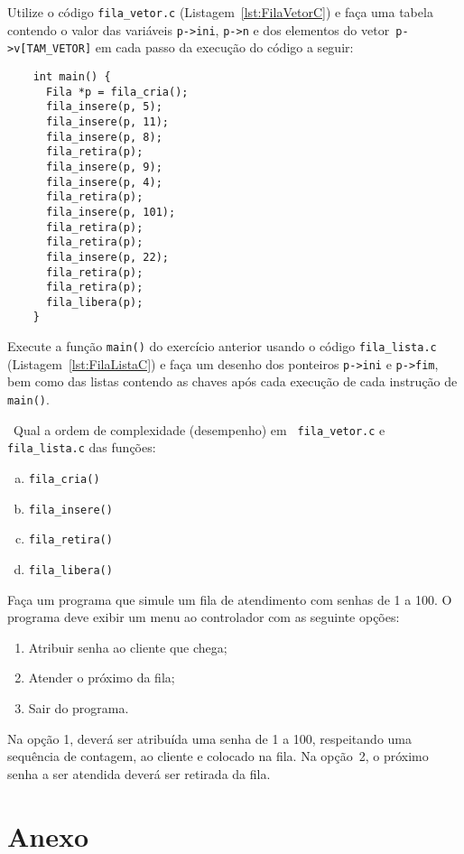 \lstset{basicstyle=\scriptsize,frame=single}

\exercise Utilize o código {\tt fila\_vetor.c}
(Listagem~\ref{lst:FilaVetorC}) e faça uma tabela contendo o valor
das variáveis {\tt p->ini}, {\tt p->n} e dos elementos do vetor{\tt
  p->v[TAM\_VETOR]} em cada passo da execução do código a seguir:

\begin{center}
  \begin{lstlisting}
    int main() {
      Fila *p = fila_cria();
      fila_insere(p, 5);
      fila_insere(p, 11);
      fila_insere(p, 8);
      fila_retira(p);
      fila_insere(p, 9);
      fila_insere(p, 4);
      fila_retira(p);
      fila_insere(p, 101);
      fila_retira(p);
      fila_retira(p);
      fila_insere(p, 22);
      fila_retira(p);
      fila_retira(p);
      fila_libera(p);
    }
  \end{lstlisting}
\end{center}

\exercise Execute a função {\tt main()} do exercício anterior usando o
código {\tt fila\_lista.c} (Listagem~\ref{lst:FilaListaC}) e faça um
desenho dos ponteiros {\tt p->ini} e {\tt p->fim}, bem como das listas
contendo as chaves após cada execução de cada instrução de {\tt main()}.

\exercise~Qual a ordem de complexidade (desempenho) em {\tt
  fila\_vetor.c} e {\tt fila\_lista.c} das funções:

\begin{enumerate}[a)]
\item {\tt fila\_cria()}
\item {\tt fila\_insere()}
\item {\tt fila\_retira()}
\item {\tt fila\_libera()}
\end{enumerate}

\exercise Faça um programa que simule um fila de atendimento com
senhas de 1 a 100. O programa deve exibir um menu ao controlador com
as seguinte opções:

\begin{enumerate}
\item Atribuir senha ao cliente que chega;
\item Atender o próximo da fila;
\item Sair do programa.
\end{enumerate}

\noindent Na opção 1, deverá ser atribuída uma senha de 1 a 100,
respeitando uma sequência de contagem, ao cliente e colocado na
fila. Na opção~2, o próximo senha a ser atendida deverá ser retirada
da fila.

\pagebreak\section*{Anexo}



